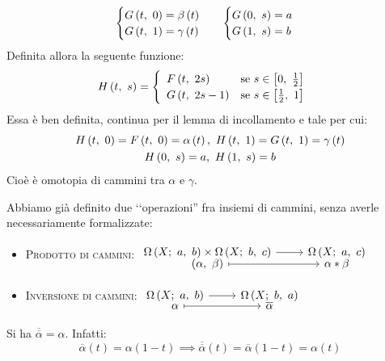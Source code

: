 \begin{demonstration}
\begin{itemize}
\begin{equation*}
\begin{array}{ll}
		\begin{cases}
			G\left(t,\ 0\right)=\beta\left(t\right)\\
			G\left(t,\ 1\right)=\gamma\left(t\right)
		\end{cases}&
	\begin{cases}
			G\left(0,\ s\right)=a\\
			G\left(1,\ s\right)=b
	\end{cases}
	\end{array}
\end{equation*}
Definita allora la seguente funzione:
\begin{equation*}
	\mvf{H}{t}{s}=\begin{cases}
		\begin{array}{ll}
			\mvf{F}{t}{2s}&\text{se }s\in\left[0,\ \frac{1}{2}\right]\\
			\mvf{G}{t}{2s-1}&\text{se }s\in\left[\frac{1}{2},\ 1\right]
		\end{array}
	\end{cases}
\end{equation*}
Essa è ben definita, continua per il lemma di incollamento e tale per cui:
\begin{gather*}
	\mvf{H}{t}{0}=\mvf{F}{t}{0}=\alpha\left(t\right),\ \mvf{H}{t}{1}=\mvf{G}{t}{1}=\gamma\left(t\right)\\
	\mvf{H}{0}{s}=a,\ \mvf{H}{1}{s}=b
\end{gather*}
		Cioè è omotopia di cammini tra $\alpha$ e $\gamma$.
	\end{itemize}
\vspace{-3mm}
\end{demonstration}
\begin{remember}
Abbiamo già definito due ‘‘operazioni'' fra insiemi di cammini, senza averle necessariamente formalizzate:
\begin{itemize}
\item \textsc{Prodotto di cammini}: $\funztot{\ }{\inscam{X}{a}{b}\times\inscam{X}{b}{c}}{\inscam{X}{a}{c}}{\left(\alpha,\ \beta\right)}{\alpha\ast\beta}$
\item \textsc{Inversione di cammini}: $\funztot{\ }{\inscam{X}{a}{b}}{\inscam{X}{b}{a}}{\alpha}{\overline{\alpha}}$
\end{itemize}
\end{remember}
\begin{observe}
Si ha $\overline{\overline{\alpha}}=\alpha$. Infatti:
\begin{equation*}
	\overline{\alpha}\left(t\right)=\alpha\left(1-t\right)\implies\overline{\overline{\alpha}}\left(t\right)=\overline{\alpha}\left(1-t\right)=\alpha\left(t\right)
\end{equation*}
\vspace{-6mm}
\end{observe}
